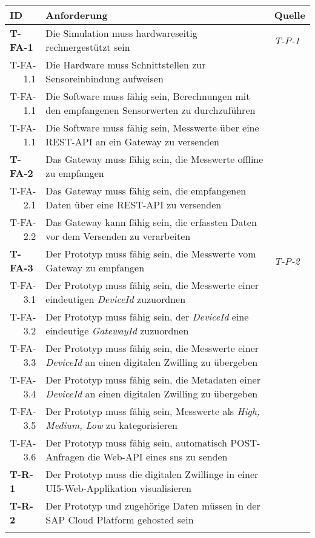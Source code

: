   \begin{tabularx}{\textwidth}{@{}lXp{1.5cm}@{}}
      \toprule
      ID                & Anforderung & Quelle \\
      \midrule
      \endhead
      \textbf{T-FA-1}              &    Die Simulation muss hardwareseitig rechnergestützt sein       & \textit{T-P-1}                \\
      \multicolumn{1}{r}{T-FA-1.1} &   Die Hardware muss Schnittstellen zur Sensoreinbindung aufweisen \\
      \multicolumn{1}{r}{T-FA-1.1} &   Die Software muss fähig sein, Berechnungen mit den empfangenen Sensorwerten zu durchzuführen \\
      \multicolumn{1}{r}{T-FA-1.1} &   Die Software muss fähig sein, Messwerte über eine REST-API an ein Gateway zu versenden \\
      \textbf{T-FA-2}              &   Das Gateway muss fähig sein, die Messwerte offline zu empfangen   \\
      \multicolumn{1}{r}{T-FA-2.1}     &   Das Gateway muss fähig sein, die empfangenen Daten über eine REST-API zu versenden   \\
      \multicolumn{1}{r}{T-FA-2.2} & Das Gateway kann fähig sein, die erfassten Daten vor dem Versenden zu verarbeiten \\
      \textbf{T-FA-3}            &      Der Prototyp muss fähig sein, die Messwerte vom Gateway zu empfangen &    \textit{T-P-2}    \\
      \multicolumn{1}{r}{T-FA-3.1}    &  Der Prototyp muss fähig sein, die Messwerte einer eindeutigen \textit{DeviceId} zuzuordnen \\
      \multicolumn{1}{r}{T-FA-3.2}    &  Der Prototyp muss fähig sein, der \textit{DeviceId} eine eindeutige \textit{GatewayId} zuzuordnen \\
      \multicolumn{1}{r}{T-FA-3.3}    &  Der Prototyp muss fähig sein, die Messwerte einer \textit{DeviceId} an einen digitalen Zwilling zu übergeben\\
      \multicolumn{1}{r}{T-FA-3.4}    &  Der Prototyp muss fähig sein, die Metadaten einer \textit{DeviceId} an einen digitalen Zwilling zu übergeben \\

      \multicolumn{1}{r}{T-FA-3.5}  &  Der Prototyp muss fähig sein, Messwerte als \textit{High, Medium, Low} zu kategorisieren \\
      \multicolumn{1}{r}{T-FA-3.6}  &  Der Prototyp muss fähig sein, automatisch POST-Anfragen die Web-API eines \ac{sns} zu senden  \\

      \textbf{T-R-1} & Der Prototyp muss die digitalen Zwillinge in einer UI5-Web-Applikation visualisieren \\
      \textbf{T-R-2} & Der Prototyp und zugehörige Daten müssen in der SAP Cloud Platform gehosted sein  \\
      \addlinespace
      \bottomrule
      \caption{Anforderungen aus technischer Ebene}
      \label{technik_anforderung}
  \end{tabularx}

  \newpage


